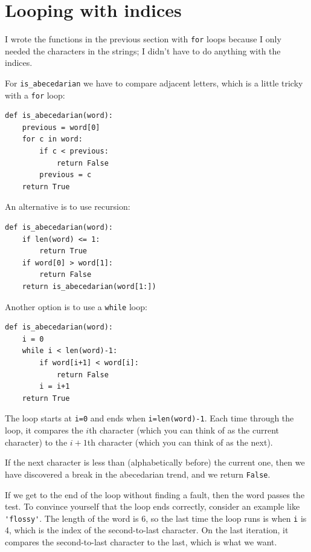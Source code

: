 \documentclass[10pt]{book}
\begin{document}


\section{Looping with indices}


I wrote the functions in the previous section with {\tt for}
loops because I only needed the characters in the strings; I didn't
have to do anything with the indices.

For \verb"is_abecedarian" we have to compare adjacent letters,
which is a little tricky with a {\tt for} loop:

\beforeverb
\begin{verbatim}
def is_abecedarian(word):
    previous = word[0]
    for c in word:
        if c < previous:
            return False
        previous = c
    return True
\end{verbatim}
\afterverb


An alternative is to
use recursion:

\beforeverb
\begin{verbatim}
def is_abecedarian(word):
    if len(word) <= 1:
        return True
    if word[0] > word[1]:
        return False
    return is_abecedarian(word[1:])
\end{verbatim}
\afterverb

Another option is to use a {\tt while} loop:

\beforeverb
\begin{verbatim}
def is_abecedarian(word):
    i = 0
    while i < len(word)-1:
        if word[i+1] < word[i]:
            return False
        i = i+1
    return True
\end{verbatim}
\afterverb
%
The loop starts at {\tt i=0} and ends when {\tt i=len(word)-1}.  Each
time through the loop, it compares the $i$th character (which you can
think of as the current character) to the $i+1$th character (which you
can think of as the next).

If the next character is less than (alphabetically before) the current
one, then we have discovered a break in the abecedarian trend, and
we return {\tt False}.

If we get to the end of the loop without finding a fault, then the
word passes the test.  To convince yourself that the loop ends
correctly, consider an example like \verb"'flossy'".  The
length of the word is 6, so
the last time the loop runs is when {\tt i} is 4, which is the
index of the second-to-last character.  On the last iteration,
it compares the second-to-last character to the last, which is
what we want.
\end{document}
